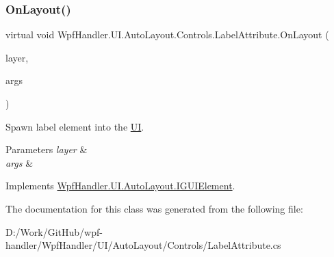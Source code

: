 \subsubsection{\texorpdfstring{On\+Layout()}{OnLayout()}}
{\footnotesize\ttfamily virtual void Wpf\+Handler.\+U\+I.\+Auto\+Layout.\+Controls.\+Label\+Attribute.\+On\+Layout (\begin{DoxyParamCaption}\item[{ref \mbox{\hyperlink{class_wpf_handler_1_1_u_i_1_1_auto_layout_1_1_layout_layer}{Layout\+Layer}}}]{layer,  }\item[{params object \mbox{[}$\,$\mbox{]}}]{args }\end{DoxyParamCaption})\hspace{0.3cm}{\ttfamily [virtual]}}



Spawn label element into the \mbox{\hyperlink{namespace_wpf_handler_1_1_u_i}{UI}}. 


\begin{DoxyParams}{Parameters}
{\em layer} & \\
\hline
{\em args} & \\
\hline
\end{DoxyParams}


Implements \mbox{\hyperlink{interface_wpf_handler_1_1_u_i_1_1_auto_layout_1_1_i_g_u_i_element_a0ff16956f8e8187d51e1b36b6b9f894e}{Wpf\+Handler.\+U\+I.\+Auto\+Layout.\+I\+G\+U\+I\+Element}}.



The documentation for this class was generated from the following file\+:\begin{DoxyCompactItemize}
\item 
D\+:/\+Work/\+Git\+Hub/wpf-\/handler/\+Wpf\+Handler/\+U\+I/\+Auto\+Layout/\+Controls/Label\+Attribute.\+cs\end{DoxyCompactItemize}
